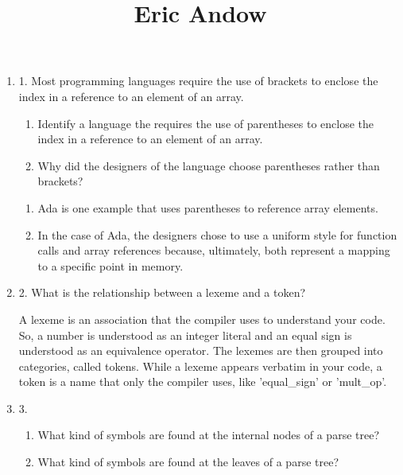 \documentclass{article}
\begin{document}
\title{Eric Andow}

\begin{enumerate}
  \item 1. Most programming languages require the use of brackets to
    enclose the index in a reference to an element of an array.
  \begin{enumerate}
    \item Identify a language the requires the use of parentheses
      to enclose the index in a reference to an element of an array.
    \item Why did the designers of the language choose parentheses
      rather than brackets?
    \end{enumerate}

  \begin{answer}

  \begin{enumerate}
    \item Ada is one example that uses parentheses to reference array elements.
    \item In the case of Ada, the designers chose to use a uniform
      style for function calls and array references because,
      ultimately, both represent a mapping to a specific point in
      memory.
    \end{enumerate}

    \end{answer}
    
  \item 2. What is the relationship between a lexeme and a token?

  \begin{answer}

    A lexeme is an association that the compiler uses to understand
    your code. So, a number is understood as an integer literal and an
    equal sign is understood as an equivalence operator. The lexemes
    are then grouped into categories, called tokens. While a lexeme
    appears verbatim in your code, a token is a name that only the
    compiler uses, like 'equal\_sign' or 'mult\_op'.

    \end{answer}

  \item 3.
  \begin{enumerate}
    \item What kind of symbols are found at the internal nodes of a
      parse tree?
    \item What kind of symbols are found at the leaves of a parse tree?
    \end{enumerate}


\end{enumerate}
\end{document}
